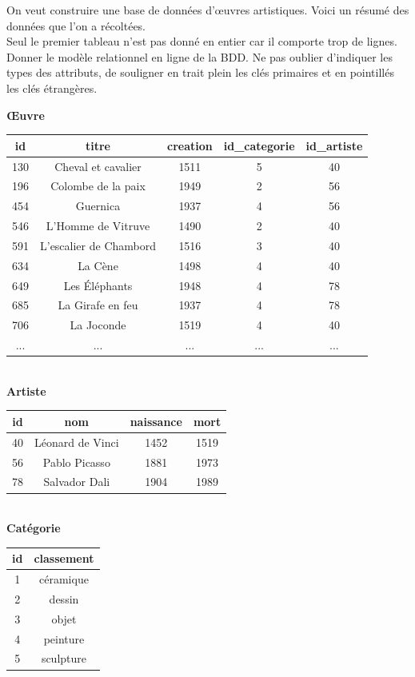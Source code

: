 \documentclass[a4paper,12pt]{article}
\begin{document}
On veut construire une base de données d'\oe uvres artistiques. Voici un résumé des données que l'on a récoltées.\\
Seul le premier tableau n'est pas donné en entier car il comporte trop de lignes.\\
Donner le modèle relationnel en ligne de la BDD. Ne pas oublier d'indiquer les types des attributs, de souligner en trait plein les clés primaires et en pointillés les clés étrangères.\\
\newpage
\begin{center}
\textbf{Œuvre}\\[1em]

\begin{tabular}{|c|c|c|c|c|}
\hline
\rowcolor{UGLiOrange} \textbf{\color{white}id} &\textbf{\color{white}titre}&\textbf{\color{white}creation}&\textbf{\color{white}id\_categorie}&\textbf{\color{white}id\_artiste}\\
\hline
130&Cheval et cavalier &1511 &5 &40\\
196&Colombe de la paix &1949 &2 &56\\
454&Guernica &1937&4&56\\
546&L'Homme de Vitruve&1490&2&40\\
591&L'escalier de Chambord&1516&3&40\\
634&La Cène&1498&4&40\\
649&Les Éléphants&1948&4&78\\
685&La Girafe en feu&1937&4&78\\
706&La Joconde&1519&4&40\\
...&... & ... & ... & ...\\
\hline
\end{tabular}\\[2em]

\textbf{Artiste}\\[1em]

\begin{tabular}{|c|c|c|c|}
\hline
\rowcolor{UGLiOrange} \textbf{\color{white}id} &\textbf{\color{white}nom}&\textbf{\color{white}naissance}&\textbf{\color{white}mort}\\
\hline
40 & Léonard de Vinci & 1452 & 1519\\
56 & Pablo Picasso & 1881 & 1973 \\
78 & Salvador Dali & 1904 & 1989\\
\hline
\end{tabular}\\[2em]

\textbf{Catégorie}\\[1em]

\begin{tabular}{|c|c|}
\hline
\rowcolor{UGLiOrange} \textbf{\color{white}id} &\textbf{\color{white}classement}\\
\hline
1 & céramique \\
2 & dessin \\
3 & objet \\
4 & peinture \\
5 & sculpture \\
\hline
\end{tabular}
\end{center}\ \\
\end{document}
